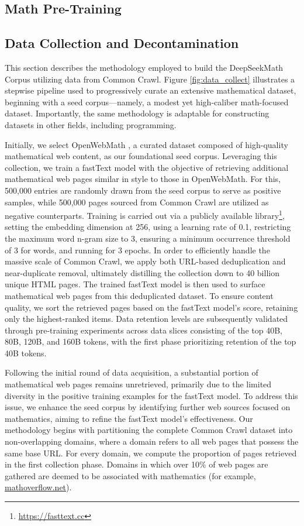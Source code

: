\begin{itemize}[topsep=0pt]
\section{Math Pre-Training}

\subsection{Data Collection and Decontamination} This section describes the methodology employed to build the DeepSeekMath Corpus utilizing data from Common Crawl. Figure \ref{fig:data_collect} illustrates a stepwise pipeline used to progressively curate an extensive mathematical dataset, beginning with a seed corpus—namely, a modest yet high-caliber math-focused dataset. Importantly, the same methodology is adaptable for constructing datasets in other fields, including programming.

Initially, we select OpenWebMath \citep{openwebmath}, a curated dataset composed of high-quality mathematical web content, as our foundational seed corpus. Leveraging this collection, we train a fastText model \citep{joulin2016fasttext} with the objective of retrieving additional mathematical web pages similar in style to those in OpenWebMath. For this, 500,000 entries are randomly drawn from the seed corpus to serve as positive samples, while 500,000 pages sourced from Common Crawl are utilized as negative counterparts. Training is carried out via a publicly available library\footnote{\url{https://fasttext.cc}}, setting the embedding dimension at 256, using a learning rate of 0.1, restricting the maximum word n-gram size to 3, ensuring a minimum occurrence threshold of 3 for words, and running for 3 epochs. In order to efficiently handle the massive scale of Common Crawl, we apply both URL-based deduplication and near-duplicate removal, ultimately distilling the collection down to 40 billion unique HTML pages. The trained fastText model is then used to surface mathematical web pages from this deduplicated dataset. To ensure content quality, we sort the retrieved pages based on the fastText model’s score, retaining only the highest-ranked items. Data retention levels are subsequently validated through pre-training experiments across data slices consisting of the top 40B, 80B, 120B, and 160B tokens, with the first phase prioritizing retention of the top 40B tokens.

Following the initial round of data acquisition, a substantial portion of mathematical web pages remains unretrieved, primarily due to the limited diversity in the positive training examples for the fastText model. To address this issue, we enhance the seed corpus by identifying further web sources focused on mathematics, aiming to refine the fastText model’s effectiveness. Our methodology begins with partitioning the complete Common Crawl dataset into non-overlapping domains, where a domain refers to all web pages that possess the same base URL. For every domain, we compute the proportion of pages retrieved in the first collection phase. Domains in which over 10\% of web pages are gathered are deemed to be associated with mathematics (for example, \url{mathoverflow.net}). 


\end{itemize}

